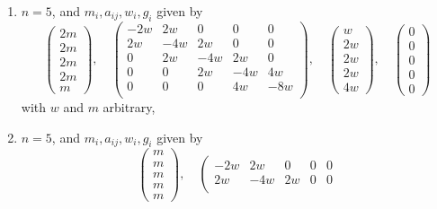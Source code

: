 \begin{lemma}
\begin{enumerate}
$$\begin{matrix}
w \\
w
\end{matrix}
\right),
\quad
\left(
\begin{matrix}
0 \\
0 \\
0 \\
0 \\
0
\end{matrix}
\right)
$$
with $w$ and $m$ arbitrary,
\item
\label{models-item-up-equal-equal-up}
$n = 5$, and $m_i, a_{ij}, w_i, g_i$ given by
$$
\left(
\begin{matrix}
2m \\
2m \\
2m \\
2m \\
m
\end{matrix}
\right),
\quad
\left(
\begin{matrix}
-2w & 2w & 0 & 0 & 0 \\
2w & -4w & 2w & 0 & 0 \\
0 & 2w & -4w & 2w & 0 \\
0 & 0 & 2w & -4w & 4w \\
0 & 0 & 0 & 4w & -8w \\
\end{matrix}
\right),
\quad
\left(
\begin{matrix}
w \\
2w \\
2w \\
2w \\
4w
\end{matrix}
\right),
\quad
\left(
\begin{matrix}
0 \\
0 \\
0 \\
0 \\
0
\end{matrix}
\right)
$$
with $w$ and $m$ arbitrary,
\item
\label{models-item-up-equal-equal-down}
$n = 5$, and $m_i, a_{ij}, w_i, g_i$ given by
$$
\left(
\begin{matrix}
m \\
m \\
m \\
m \\
m
\end{matrix}
\right),
\quad
\left(
\begin{matrix}
-2w & 2w & 0 & 0 & 0 \\
2w & -4w & 2w & 0 & 0 \\

\end{matrix}$$
\end{enumerate}
\end{lemma}
